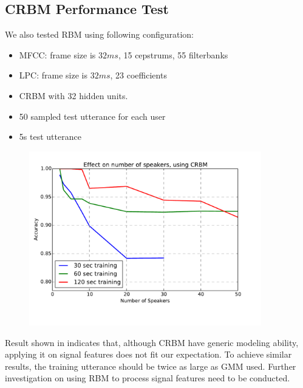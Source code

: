 \subsection{CRBM Performance Test}
We also tested RBM using following configuration:
\begin{itemize}
  \item MFCC: frame size is $32 ms $, 15 cepstrums, 55 filterbanks
  \item LPC: frame size is $32 ms $, 23 coefficients
  \item CRBM with 32 hidden units.
  \item 50 sampled test utterance for each user
  \item 5s test utterance
\end{itemize}

\begin{figure}[H]
  \centering
  \includegraphics[width=0.9\textwidth]{img/crbm.pdf}
  \caption{\label{crbmresult}}
\end{figure}

Result shown in  indicates that, although CRBM have
generic modeling ability, applying it on signal features does not fit
our expectation. To achieve similar results, the training utterance should
be twice as large as GMM used. Further investigation on using RBM to
process signal features need to be conducted.


